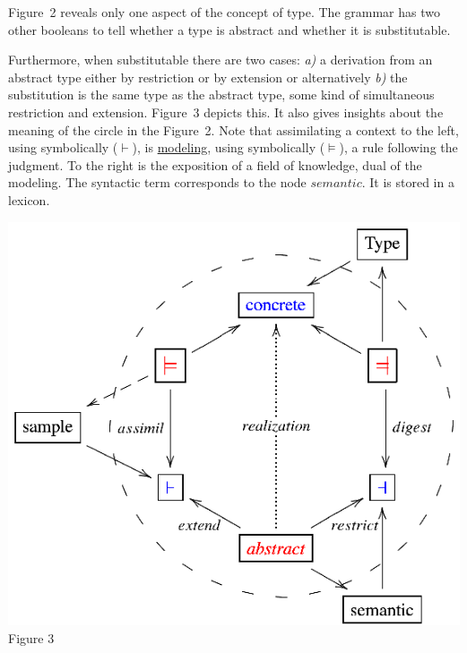 Figure~2 reveals only one aspect of the concept 
of type. The grammar has two other booleans to tell whether a type is
abstract and whether it is substitutable.\\ 
\noindent
\begin{minipage}[h]{5.2cm}
\indent
Furthermore, when 
substitutable there are two cases: {\it a)} a derivation from an abstract type
either by restriction or by extension or alternatively {\it b)} the substitution is 
the same type as the abstract type, some kind of simultaneous restriction 
and extension. 
Figure~3 depicts this. It also
gives insights about the meaning of the circle in the Figure~2.
Note that assimilating a context to the left, using symbolically ($\vdash$), 
is \underline{modeling}, using symbolically ($\models$), a rule following the judgment. 
To the right is the exposition of a field of knowledge, dual of the modeling. 
The syntactic term corresponds to the node $semantic$. It is stored in a lexicon.

\end{minipage}
\begin{minipage}[h]{8.8cm}
 \begin{center}

  \includegraphics[]{part8/Viallefond_P52/P52_3.eps}
\\ Figure 3

 \end{center}
\end{minipage}
\hfill

